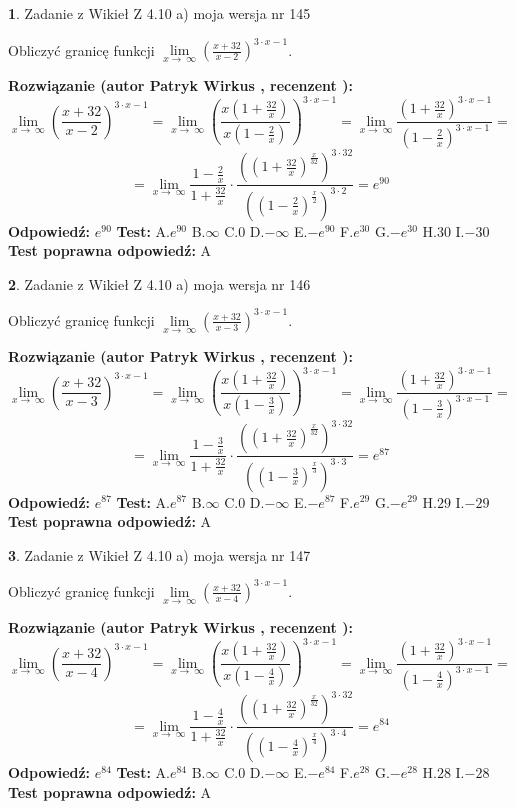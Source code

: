 \documentclass[12pt, a4paper]{article}
\theoremstyle{definition} %
\newtheorem{zad}{}
\newcommand{\zadStart}[1]{\begin{zad}#1\newline}
\newcommand{\zadStop}{\end{zad}}
\newcommand{\rozwStart}[2]{\noindent \textbf{Rozwiązanie (autor #1 , recenzent #2): }\newline}
\newcommand{\rozwStop}{\newline}
\newcommand{\odpStart}{\noindent \textbf{Odpowiedź:}\newline}
\newcommand{\odpStop}{\newline}
\newcommand{\testStart}{\noindent \textbf{Test:}\newline}
\newcommand{\testStop}{\newline}
\newcommand{\kluczStart}{\noindent \textbf{Test poprawna odpowiedź:}\newline}
\newcommand{\kluczStop}{\newline}
\begin{document}
\zadStart{Zadanie z Wikieł Z 4.10 a) moja wersja nr 145}

Obliczyć granicę funkcji  $\lim\limits_{x\to\ \infty}(\frac{x+32}{x-2})^{3\cdot x-1}$.
\zadStop
\rozwStart{Patryk Wirkus}{}
$$\lim\limits_{x\to\ \infty}(\frac{x+32}{x-2})^{3\cdot x-1} = \lim\limits_{x\to\ \infty}(\frac{x(1+\frac{32}{x})}{x(1-\frac{2}{x})})^{3\cdot x-1}=\lim\limits_{x\to\ \infty}\frac{(1+\frac{32}{x})^{3\cdot x-1}}{(1-\frac{2}{x})^{3\cdot x-1}}=$$
$$=\lim\limits_{x\to\ \infty}\frac{1-\frac{2}{x}}{1+\frac{32}{x}}\cdot\frac{((1+\frac{32}{x})^{\frac{x}{32}})^{3\cdot32}}{((1-\frac{2}{x})^{\frac{x}{2}})^{3\cdot2}}=e^{90}$$
\rozwStop
\odpStart
$e^{90}$
\odpStop
\testStart
A.$e^{90}$ B.$\infty$ C.$0$ D.$-\infty$ E.$-e^{90}$
F.$e^{30}$ G.$-e^{30}$
H.$30$
I.$-30$
\testStop
\kluczStart
A
\kluczStop



\zadStart{Zadanie z Wikieł Z 4.10 a) moja wersja nr 146}

Obliczyć granicę funkcji  $\lim\limits_{x\to\ \infty}(\frac{x+32}{x-3})^{3\cdot x-1}$.
\zadStop
\rozwStart{Patryk Wirkus}{}
$$\lim\limits_{x\to\ \infty}(\frac{x+32}{x-3})^{3\cdot x-1} = \lim\limits_{x\to\ \infty}(\frac{x(1+\frac{32}{x})}{x(1-\frac{3}{x})})^{3\cdot x-1}=\lim\limits_{x\to\ \infty}\frac{(1+\frac{32}{x})^{3\cdot x-1}}{(1-\frac{3}{x})^{3\cdot x-1}}=$$
$$=\lim\limits_{x\to\ \infty}\frac{1-\frac{3}{x}}{1+\frac{32}{x}}\cdot\frac{((1+\frac{32}{x})^{\frac{x}{32}})^{3\cdot32}}{((1-\frac{3}{x})^{\frac{x}{3}})^{3\cdot3}}=e^{87}$$
\rozwStop
\odpStart
$e^{87}$
\odpStop
\testStart
A.$e^{87}$ B.$\infty$ C.$0$ D.$-\infty$ E.$-e^{87}$
F.$e^{29}$ G.$-e^{29}$
H.$29$
I.$-29$
\testStop
\kluczStart
A
\kluczStop



\zadStart{Zadanie z Wikieł Z 4.10 a) moja wersja nr 147}

Obliczyć granicę funkcji  $\lim\limits_{x\to\ \infty}(\frac{x+32}{x-4})^{3\cdot x-1}$.
\zadStop
\rozwStart{Patryk Wirkus}{}
$$\lim\limits_{x\to\ \infty}(\frac{x+32}{x-4})^{3\cdot x-1} = \lim\limits_{x\to\ \infty}(\frac{x(1+\frac{32}{x})}{x(1-\frac{4}{x})})^{3\cdot x-1}=\lim\limits_{x\to\ \infty}\frac{(1+\frac{32}{x})^{3\cdot x-1}}{(1-\frac{4}{x})^{3\cdot x-1}}=$$
$$=\lim\limits_{x\to\ \infty}\frac{1-\frac{4}{x}}{1+\frac{32}{x}}\cdot\frac{((1+\frac{32}{x})^{\frac{x}{32}})^{3\cdot32}}{((1-\frac{4}{x})^{\frac{x}{4}})^{3\cdot4}}=e^{84}$$
\rozwStop
\odpStart
$e^{84}$
\odpStop
\testStart
A.$e^{84}$ B.$\infty$ C.$0$ D.$-\infty$ E.$-e^{84}$
F.$e^{28}$ G.$-e^{28}$
H.$28$
I.$-28$
\testStop
\kluczStart
A
\kluczStop
\end{document}
